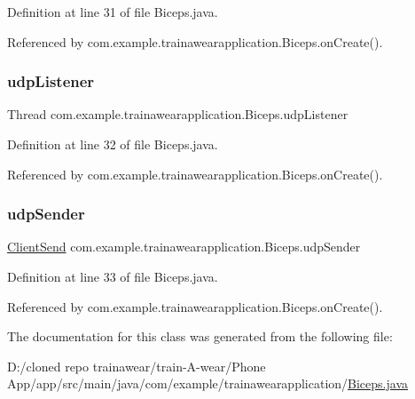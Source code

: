 Definition at line 31 of file Biceps.\+java.



Referenced by com.\+example.\+trainawearapplication.\+Biceps.\+on\+Create().

\mbox{\label{classcom_1_1example_1_1trainawearapplication_1_1_biceps_a066fa540c01d0299cab5c4a1a2cf2f5f}} 
\subsubsection{\texorpdfstring{udpListener}{udpListener}}
{\footnotesize\ttfamily Thread com.\+example.\+trainawearapplication.\+Biceps.\+udp\+Listener\hspace{0.3cm}{\ttfamily [private]}}



Definition at line 32 of file Biceps.\+java.



Referenced by com.\+example.\+trainawearapplication.\+Biceps.\+on\+Create().

\mbox{\label{classcom_1_1example_1_1trainawearapplication_1_1_biceps_acfb63670051beb8e048beea485e8576a}} 
\subsubsection{\texorpdfstring{udpSender}{udpSender}}
{\footnotesize\ttfamily \mbox{\hyperlink{classcom_1_1example_1_1trainawearapplication_1_1_client_send}{Client\+Send}} com.\+example.\+trainawearapplication.\+Biceps.\+udp\+Sender\hspace{0.3cm}{\ttfamily [private]}}



Definition at line 33 of file Biceps.\+java.



Referenced by com.\+example.\+trainawearapplication.\+Biceps.\+on\+Create().



The documentation for this class was generated from the following file\+:\begin{DoxyCompactItemize}
\item 
D\+:/cloned repo trainawear/train-\/\+A-\/wear/\+Phone App/app/src/main/java/com/example/trainawearapplication/\mbox{\hyperlink{_biceps_8java}{Biceps.\+java}}\end{DoxyCompactItemize}
